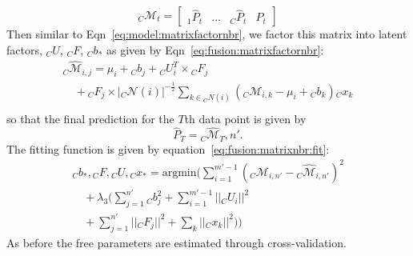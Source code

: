 \begin{equation}
  \label{eq:fusion:predictionmatrix}
  {}_C\mathcal{M}_{t} = \left[\begin{array}{llll}
      {}_1\widehat{P}_{t}& \dots & {}_C\widehat{P}_t & P_t 
    \end{array}
  \right]
\end{equation}
Then similar to Eqn~\ref{eq:model:matrixfactornbr}, we 
factor this matrix into latent factors, ${}_C U$, ${}_C F$, ${}_C b_*$ as 
given by Eqn~\ref{eq:fusion:matrixfactornbr}:
\begin{equation}
  \label{eq:fusion:matrixfactornbr}
  \begin{array}{l}
    {}_C \widehat{\mathcal{M}}_{i,j} =  \mu_i + {}_C b_{j} + {}_C U_i^T\times {}_C F_j \\
                                \quad + {}_C F_j \times |{}_C \mathcal{N}(i)|^{-\frac{1}{2}}
    \sum_{k \in {}_C N(i)} ({}_C\mathcal{M}_{i,k} - \mu_i + {}_C b_{k}) {}_Cx_k \\
  \end{array}
\end{equation}
so that the final prediction for the
$T$th data point is given by
\[\widehat{P}_T = {}_C \widehat{\mathcal{M}}_T,n'.\]
The fitting function is given by equation~\ref{eq:fusion:matrixnbr:fit}:
\begin{equation}
  \label{eq:fusion:matrixnbr:fit}
  \begin{array}{l}
    {}_C b_*, {}_C F, {}_C U, {}_C x_*  = \textrm{argmin} (\sum \limits_{i=1}^{m'-1} \left({}_C \mathcal{M}_{i,n'} - {}_C \widehat{\mathcal{M}}_{i,n'}   \right)^2 \\
     \quad + \lambda_3 (\sum \limits_{j=1}^{n'}{}_C b_j^2 + \sum \limits_{i=1}^{m'-1} ||{}_C U_i||^2 \\
     \quad+ \sum \limits_{j=1}^{n'} ||{}_C F_j||^2 + \sum_k ||{}_C x_k||^2))
  \end{array}
\end{equation}
\noindent
As before the free parameters are estimated through cross-validation.

